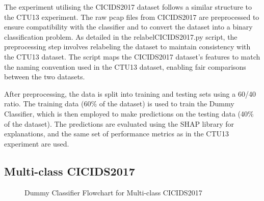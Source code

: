 The experiment utilising the CICIDS2017 dataset follows a similar structure to the CTU13 experiment. The raw pcap files from CICIDS2017 are preprocessed to ensure compatibility with the classifier and to convert the dataset into a binary classification problem. As detailed in the relabelCICIDS2017.py script, the preprocessing step involves relabeling the dataset to maintain consistency with the CTU13 dataset. The script maps the CICIDS2017 dataset's features to match the naming convention used in the CTU13 dataset, enabling fair comparisons between the two datasets.

After preprocessing, the data is split into training and testing sets using a 60/40 ratio. The training data (60\% of the dataset) is used to train the Dummy Classifier, which is then employed to make predictions on the testing data (40\% of the dataset). The predictions are evaluated using the SHAP library for explanations, and the same set of performance metrics as in the CTU13 experiment are used.

\subsection{Multi-class CICIDS2017}

\begin{figure}[H]
\centering
{}
\caption{Dummy Classifier Flowchart for Multi-class CICIDS2017}\label{fig:DummyRandomFlowMultiCICIDS2017}
\end{figure}

